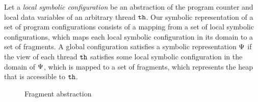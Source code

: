 Let a {\em local symbolic configuration} be an abstraction of the program
counter and local data variables of an arbitrary thread ${\tt th}$.
Our symbolic representation of a set of program configurations consists of
a mapping from a set of local symbolic configurations,
which maps each local symbolic configuration in its domain to a set of fragments.
A global configuration satisfies a symbolic representation $\Psi$
if the view of each thread ${\tt th}$ satisfies some local symbolic
configuration in the domain of $\Psi$, which is mapped to a set
of fragments, which represents the heap that is accessible to ${\tt th}$.

\begin{figure}
	
\caption{Fragment abstraction}
\label{fig:tsviewshape}
\end{figure} 

